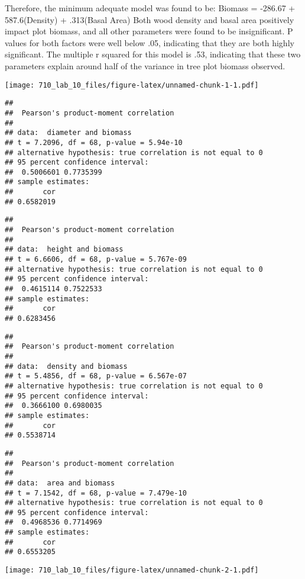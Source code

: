 \documentclass[]{article}
\begin{document}
Therefore, the minimum adequate model was found to be: Biomass = -286.67
+ 587.6(Density) + .313(Basal Area) Both wood density and basal area
positively impact plot biomass, and all other parameters were found to
be insignificant. P values for both factors were well below .05,
indicating that they are both highly significant. The multiple r squared
for this model is .53, indicating that these two parameters explain
around half of the variance in tree plot biomass observed.

\texttt{[image: 710\_lab\_10\_files/figure-latex/unnamed-chunk-1-1.pdf]}

\begin{verbatim}
## 
##  Pearson's product-moment correlation
## 
## data:  diameter and biomass
## t = 7.2096, df = 68, p-value = 5.94e-10
## alternative hypothesis: true correlation is not equal to 0
## 95 percent confidence interval:
##  0.5006601 0.7735399
## sample estimates:
##       cor 
## 0.6582019
\end{verbatim}

\begin{verbatim}
## 
##  Pearson's product-moment correlation
## 
## data:  height and biomass
## t = 6.6606, df = 68, p-value = 5.767e-09
## alternative hypothesis: true correlation is not equal to 0
## 95 percent confidence interval:
##  0.4615114 0.7522533
## sample estimates:
##       cor 
## 0.6283456
\end{verbatim}

\begin{verbatim}
## 
##  Pearson's product-moment correlation
## 
## data:  density and biomass
## t = 5.4856, df = 68, p-value = 6.567e-07
## alternative hypothesis: true correlation is not equal to 0
## 95 percent confidence interval:
##  0.3666100 0.6980035
## sample estimates:
##       cor 
## 0.5538714
\end{verbatim}

\begin{verbatim}
## 
##  Pearson's product-moment correlation
## 
## data:  area and biomass
## t = 7.1542, df = 68, p-value = 7.479e-10
## alternative hypothesis: true correlation is not equal to 0
## 95 percent confidence interval:
##  0.4968536 0.7714969
## sample estimates:
##       cor 
## 0.6553205
\end{verbatim}

\texttt{[image: 710\_lab\_10\_files/figure-latex/unnamed-chunk-2-1.pdf]}
\end{document}
